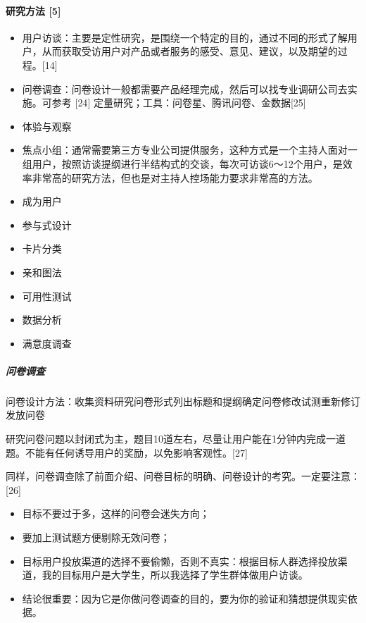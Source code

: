 \documentclass[letterpaper,11pt,english]{sphinxmanual}
\begin{document}
\paragraph{研究方法 {[}5{]}}
\label{\detokenize{chapter_knowledge/users_analysis:id28}}\begin{itemize}
\item {} 
用户访谈：主要是定性研究，是围绕一个特定的目的，通过不同的形式了解用户，从而获取受访用户对产品或者服务的感受、意见、建议，以及期望的过程。{[}14{]}

\item {} 
问卷调查：问卷设计一般都需要产品经理完成，然后可以找专业调研公司去实施。可参考
{[}24{]} 定量研究；工具：问卷星、腾讯问卷、金数据{[}25{]}

\item {} 
体验与观察

\item {} 
焦点小组：通常需要第三方专业公司提供服务，这种方式是一个主持人面对一组用户，按照访谈提纲进行半结构式的交谈，每次可访谈6～12个用户，是效率非常高的研究方法，但也是对主持人控场能力要求非常高的方法。

\item {} 
成为用户

\item {} 
参与式设计

\item {} 
卡片分类

\item {} 
亲和图法

\item {} 
可用性测试

\item {} 
数据分析

\item {} 
满意度调查

\end{itemize}


\subparagraph{问卷调查}
\label{\detokenize{chapter_knowledge/users_analysis:id29}}
问卷设计方法：收集资料\sphinxhyphen{}研究问卷形式\sphinxhyphen{}列出标题和提纲\sphinxhyphen{}确定问卷\sphinxhyphen{}修改试测\sphinxhyphen{}重新修订\sphinxhyphen{}发放问卷

研究问卷问题以封闭式为主，题目10道左右，尽量让用户能在1分钟内完成一道题。不能有任何诱导用户的奖励，以免影响客观性。{[}27{]}

同样，问卷调查除了前面介绍、问卷目标的明确、问卷设计的考究。一定要注意：{[}26{]}
\begin{itemize}
\item {} 
目标不要过于多，这样的问卷会迷失方向；

\item {} 
要加上测试题方便剔除无效问卷；

\item {} 
目标用户投放渠道的选择不要偷懒，否则不真实：根据目标人群选择投放渠道，我的目标用户是大学生，所以我选择了学生群体做用户访谈。

\item {} 
结论很重要：因为它是你做问卷调查的目的，要为你的验证和猜想提供现实依据。

\end{itemize}
\end{document}
